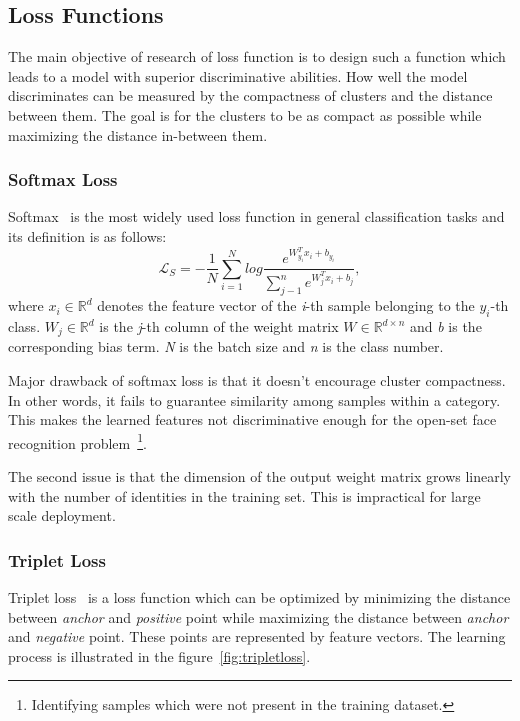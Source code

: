 \subsection{Loss Functions}\label{subsec:loss-functions}
The main objective of research of loss function is to design such a function which leads to a model with superior
discriminative abilities.
How well the model discriminates can be measured by the compactness of clusters and the distance between them.
The goal is for the clusters to be as compact as possible while maximizing the distance in-between them.

\subsubsection{Softmax Loss}\label{subsubsec:softmax-loss}
Softmax~\cite{ArcFace} is the most widely used loss function in general classification tasks and its definition is as
follows:
\begin{equation}
    \label{eq:softmax}
    \mathcal{L}_S = -\frac{1}{N} \sum_{i=1}^{N} log \frac{e^{W^T_{y_i} x_{i} + b_{y_i}}}
    {\sum_{j-1}^{n} e^{W^T_{j} x_{i} + b_{j}}},
\end{equation}
where $x_i \in \mathbb{R}^{d}$ denotes the feature vector of the \textit{i}-th sample belonging to the $y_i$-th class.
$W_j \in \mathbb{R}^{d}$ is the \textit{j}-th column of the weight matrix $W \in \mathbb{R}^{d \times n}$ and \textit{b}
is the corresponding bias term.
\textit{N} is the batch size and \textit{n} is the class number.

Major drawback of softmax loss is that it doesn't encourage cluster compactness.
In other words, it fails to guarantee similarity among samples within a category.
This makes the learned features not discriminative enough for the open-set face recognition
problem~\footnote{Identifying samples which were not present in the training dataset.}.

The second issue is that the dimension of the output weight matrix grows linearly with the number of identities in the
training set.
This is impractical for large scale deployment.

\subsubsection{Triplet Loss}\label{subsubsec:triplet-loss}
Triplet loss~\cite{TripletLoss} is a loss function which can be optimized by minimizing the distance between
\textit{anchor} and \textit{positive} point while maximizing the distance between \textit{anchor} and \textit{negative}
point.
These points are represented by feature vectors.
The learning process is illustrated in the figure~\ref{fig:tripletloss}.

